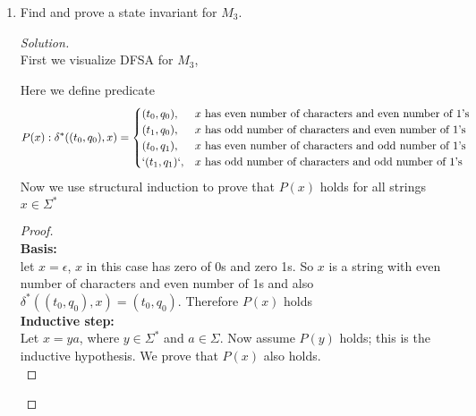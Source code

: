 \documentclass[11pt]{article}
\theoremstyle{plain}%
\theoremstyle{definition}
\theoremstyle{remark}
\newenvironment{solution}
  {\begin{proof}[Solution]}
  {\end{proof}}
\begin{document}
\begin{enumerate}
\item Find and prove a state invariant for $M_3$.
\begin{solution}
  $ $\\
  First we visualize DFSA for $M_3$,
  \begin{center}
  \end{center}
  Here we define predicate
  \[
    P(x): \delta^{*}((t_0, q_0), x) =
    \begin{cases}
      (t_0, q_0), & x \text{ has even number of characters and even number of 1's} \\
      (t_1, q_0), & x \text{ has odd number of characters and even number of 1's} \\
      (t_0, q_1), & x \text{ has even number of characters and odd number of 1's} \\
      `(t_1, q_1)`, & x \text{ has odd number of characters and odd number of 1's} \\
    \end{cases}
   \]
  Now we use structural induction to prove that $P(x)$ holds for all strings $x\in \Sigma^*$
  \begin{proof}
    $ $\\
    \textbf{Basis:}\\
    let $x=\epsilon$, $x$ in this case has zero of 0s and zero 1s. So $x$ is a string with even number of characters and even number of 1s and also $\delta^* ((t_0, q_0), x) = (t_0, q_0)$. Therefore $P(x)$ holds \\
    \textbf{Inductive step:} \\
    Let $x = ya$, where $y\in \Sigma^*$ and $a\in \Sigma$. Now assume $P(y)$ holds; this is the inductive hypothesis. We prove that $P(x)$ also holds. \\

\end{proof}
\end{solution}
\end{enumerate}
\end{document}
